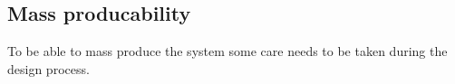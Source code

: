 \subsection{Mass producability}
To be able to mass produce the system some care needs to be taken during the design process.

